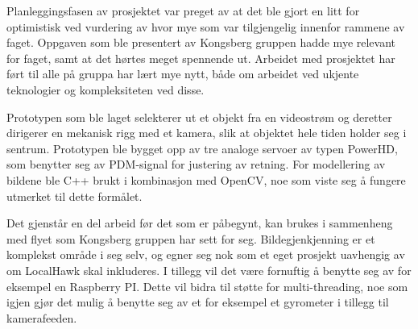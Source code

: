 Planleggingsfasen av prosjektet var preget av at det ble gjort en litt for optimistisk ved vurdering av hvor mye som var tilgjengelig innenfor rammene av faget. Oppgaven som ble presentert av Kongsberg gruppen hadde mye relevant for faget, samt at det hørtes meget spennende ut. Arbeidet med prosjektet har ført til alle på gruppa har lært mye nytt, både om arbeidet ved ukjente teknologier og kompleksiteten ved disse.

Prototypen som ble laget selekterer ut et objekt fra en videostrøm og deretter dirigerer en mekanisk rigg med et kamera, slik at objektet hele tiden holder seg i sentrum. Prototypen ble bygget opp av tre analoge servoer av typen PowerHD, som benytter seg av PDM-signal for justering av retning. For modellering av bildene ble C++ brukt i kombinasjon med OpenCV, noe som viste seg å fungere utmerket til dette formålet. 

Det gjenstår en del arbeid før det som er påbegynt, kan brukes i sammenheng med flyet som Kongsberg gruppen har sett for seg. Bildegjenkjenning er et komplekst område i seg selv, og egner seg nok som et eget prosjekt uavhengig av om LocalHawk skal inkluderes. I tillegg vil det være fornuftig å benytte seg av for eksempel en Raspberry PI. Dette vil bidra til støtte for multi-threading, noe som igjen gjør det mulig å benytte seg av et for eksempel et gyrometer i tillegg til kamerafeeden.  
